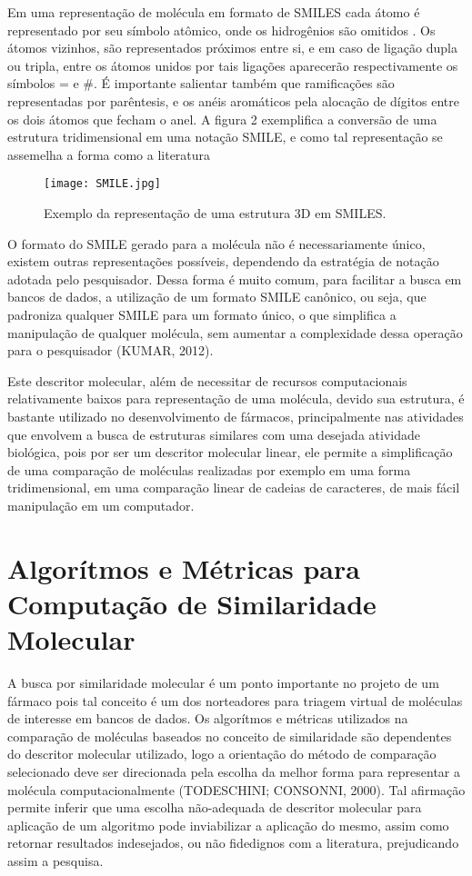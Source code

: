 Em uma representação de molécula em formato de SMILES cada átomo é representado por seu símbolo atômico, onde os hidrogênios são omitidos \cite{anderson1987smiles}. Os átomos vizinhos, são representados próximos entre si, e em caso de ligação dupla ou tripla, entre os átomos unidos por tais ligações aparecerão respectivamente os símbolos = e \#. É importante salientar também que ramificações são representadas por parêntesis, e os anéis aromáticos pela alocação de dígitos entre os dois átomos que fecham o anel. A figura 2 exemplifica a conversão de uma estrutura tridimensional em uma notação SMILE, e como tal representação se assemelha a forma como a literatura

\begin{figure}[!htb]
	\centering
	\caption[Exemplo de Molécula representada em SMILE]{Exemplo da representação de uma estrutura 3D em SMILES.}
	\texttt{[image: SMILE.jpg]} %
	\label{fig:dummy}
\end{figure}

O formato do SMILE gerado para a molécula não é necessariamente único, existem
outras representações possíveis, dependendo da estratégia de notação adotada pelo 
pesquisador. Dessa forma é muito comum, para facilitar a busca em bancos de dados, a 
utilização de um formato SMILE canônico, ou seja, que padroniza qualquer SMILE para um 
formato único, o que simplifica a manipulação de qualquer molécula, sem aumentar a 
complexidade dessa operação para o pesquisador (KUMAR, 2012).

Este descritor molecular, além de necessitar de recursos computacionais relativamente 
baixos para representação de uma molécula, devido sua estrutura, é 
bastante utilizado no desenvolvimento de fármacos, principalmente nas atividades que 
envolvem a busca de estruturas similares com uma desejada atividade biológica, pois por ser 
um descritor molecular linear, ele permite a simplificação de uma comparação de moléculas 
realizadas por exemplo em uma forma tridimensional, em uma comparação linear de cadeias 
de caracteres, de mais fácil manipulação em um computador. 

\section{Algorítmos e Métricas para Computação de Similaridade Molecular}

A busca por similaridade molecular é um ponto importante no projeto de um
fármaco pois tal conceito é um dos norteadores para triagem virtual de moléculas de interesse em bancos de dados. Os algorítmos e métricas utilizados na comparação de moléculas baseados no conceito de similaridade são dependentes do descritor molecular utilizado, logo a orientação do método de comparação selecionado deve ser direcionada pela escolha da melhor forma para representar a molécula computacionalmente (TODESCHINI; CONSONNI, 2000). Tal afirmação permite inferir que uma escolha não-adequada de descritor molecular para aplicação de um algoritmo pode inviabilizar a aplicação do mesmo, assim como retornar resultados indesejados, ou não fidedignos com a literatura, prejudicando assim a pesquisa.

